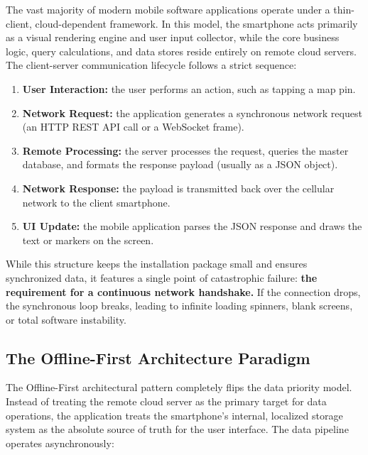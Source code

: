 \documentclass[12pt,a4paper,oneside]{report}
\begin{document}
The vast majority of modern mobile software applications operate under a thin-client,
cloud-dependent framework. In this model, the smartphone acts primarily as a visual
rendering engine and user input collector, while the core business logic, query
calculations, and data stores reside entirely on remote cloud servers. The client-server
communication lifecycle follows a strict sequence:

\begin{enumerate}[leftmargin=1.6em]
  \item \textbf{User Interaction:} the user performs an action, such as tapping a map pin.
  \item \textbf{Network Request:} the application generates a synchronous network request
        (an HTTP REST API call or a WebSocket frame).
  \item \textbf{Remote Processing:} the server processes the request, queries the master
        database, and formats the response payload (usually as a JSON object).
  \item \textbf{Network Response:} the payload is transmitted back over the cellular
        network to the client smartphone.
  \item \textbf{UI Update:} the mobile application parses the JSON response and draws the
        text or markers on the screen.
\end{enumerate}

While this structure keeps the installation package small and ensures synchronized data,
it features a single point of catastrophic failure: \textbf{the requirement for a
continuous network handshake.} If the connection drops, the synchronous loop breaks,
leading to infinite loading spinners, blank screens, or total software instability.

\subsection{The Offline-First Architecture Paradigm}

The Offline-First architectural pattern completely flips the data priority model. Instead
of treating the remote cloud server as the primary target for data operations, the
application treats the smartphone's internal, localized storage system as the absolute
source of truth for the user interface. The data pipeline operates asynchronously:
\end{document}
